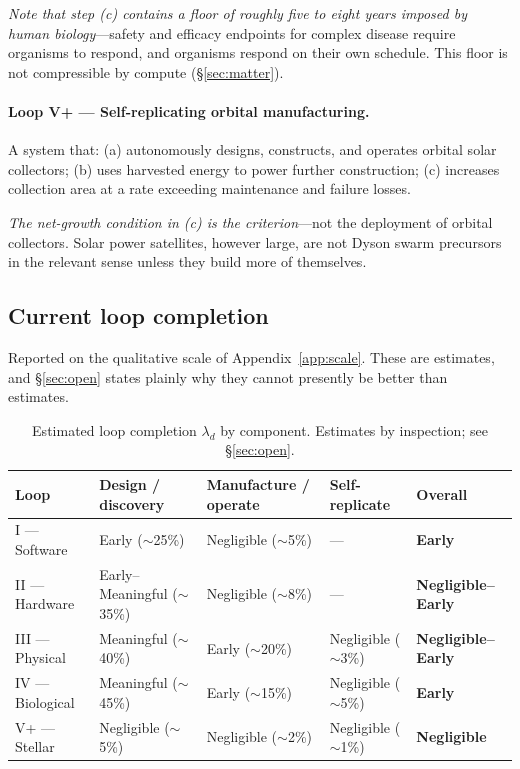 \documentclass[11pt]{article}
\begin{document}
\emph{Note that step (c) contains a floor of roughly five to eight years imposed by human biology}---safety and efficacy endpoints for complex disease require organisms to respond, and organisms respond on their own schedule. This floor is not compressible by compute (\S\ref{sec:matter}).

\paragraph{Loop V+ --- Self-replicating orbital manufacturing.} A system that: (a) autonomously designs, constructs, and operates orbital solar collectors; (b) uses harvested energy to power further construction; (c) increases collection area at a rate exceeding maintenance and failure losses.

\emph{The net-growth condition in (c) is the criterion}---not the deployment of orbital collectors. Solar power satellites, however large, are not Dyson swarm \citep{dyson1960} precursors in the relevant sense unless they build more of themselves.

\subsection{Current loop completion}
\label{sec:completion}

Reported on the qualitative scale of Appendix~\ref{app:scale}. These are estimates, and \S\ref{sec:open} states plainly why they cannot presently be better than estimates.

\begin{table}[h]
\centering
\footnotesize
\begin{tabular}{@{}lllll@{}}
\toprule
Loop & Design / discovery & Manufacture / operate & Self-replicate & Overall \\
\midrule
I --- Software   & Early ($\sim$25\%)            & Negligible ($\sim$5\%)  & ---                    & \textbf{Early} \\
II --- Hardware  & Early--Meaningful ($\sim$35\%)& Negligible ($\sim$8\%)  & ---                    & \textbf{Negligible--Early} \\
III --- Physical & Meaningful ($\sim$40\%)       & Early ($\sim$20\%)      & Negligible ($\sim$3\%) & \textbf{Negligible--Early} \\
IV --- Biological& Meaningful ($\sim$45\%)       & Early ($\sim$15\%)      & Negligible ($\sim$5\%) & \textbf{Early} \\
V+ --- Stellar   & Negligible ($\sim$5\%)        & Negligible ($\sim$2\%)  & Negligible ($\sim$1\%) & \textbf{Negligible} \\
\bottomrule
\end{tabular}
\caption{Estimated loop completion $\lambda_d$ by component. Estimates by inspection; see \S\ref{sec:open}.}
\end{table}
\end{document}

